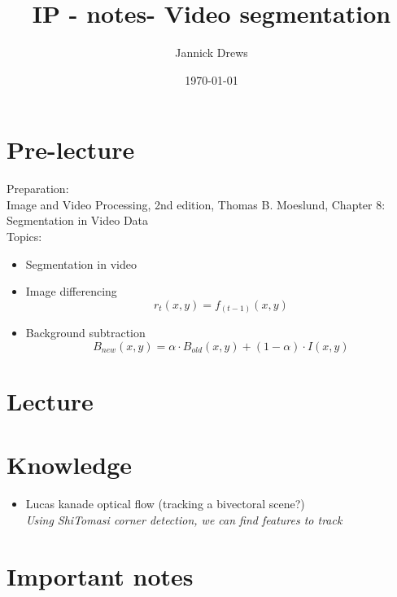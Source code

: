 \documentclass{article}
\title{IP - notes- Video segmentation}
\author{Jannick Drews}
\date{\today}
\begin{document}
\maketitle
\newpage

\section{Pre-lecture}
Preparation:\\Image and Video Processing, 2nd edition, Thomas B. Moeslund, Chapter 8: Segmentation in Video Data\\
Topics:
\begin{itemize}
    \item Segmentation in video

    \item Image differencing
        $$ r_t(x, y) = f_{(t-1)}(x, y) $$
    \item Background subtraction
        $$ B_{new}(x, y) = \alpha \cdot B_{old}(x, y) + (1 - \alpha) \cdot I(x, y) $$
\end{itemize}

\section{Lecture}



\section{Knowledge}
\begin{itemize}
    \item Lucas kanade optical flow (tracking a bivectoral scene?)\\
    \textit{Using ShiTomasi corner detection, we can find features to track}
\end{itemize}

\section{Important notes}
\end{document}
